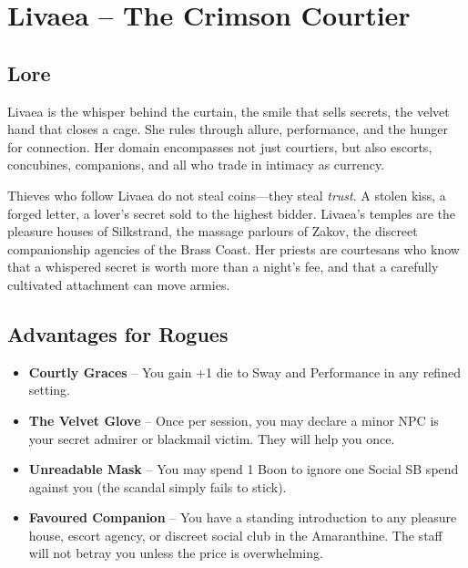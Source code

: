 \documentclass[10pt,twoside]{book}
\begin{document}
\chapter{Livaea -- The Crimson Courtier}

\section{Lore}
Livaea is the whisper behind the curtain, the smile that sells secrets, the velvet hand that closes a cage. She rules through allure, performance, and the hunger for connection. Her domain encompasses not just courtiers, but also escorts, concubines, companions, and all who trade in intimacy as currency.

Thieves who follow Livaea do not steal coins---they steal \emph{trust}. A stolen kiss, a forged letter, a lover's secret sold to the highest bidder. Livaea's temples are the pleasure houses of Silkstrand, the massage parlours of Zakov, the discreet companionship agencies of the Brass Coast. Her priests are courtesans who know that a whispered secret is worth more than a night's fee, and that a carefully cultivated attachment can move armies.

\section{Advantages for Rogues}
\begin{itemize}
\item \textbf{Courtly Graces} -- You gain +1 die to Sway and Performance in any refined setting.
\item \textbf{The Velvet Glove} -- Once per session, you may declare a minor NPC is your secret admirer or blackmail victim. They will help you once.
\item \textbf{Unreadable Mask} -- You may spend 1 Boon to ignore one Social SB spend against you (the scandal simply fails to stick).
\item \textbf{Favoured Companion} -- You have a standing introduction to any pleasure house, escort agency, or discreet social club in the Amaranthine. The staff will not betray you unless the price is overwhelming.
\end{itemize}
\end{document}
